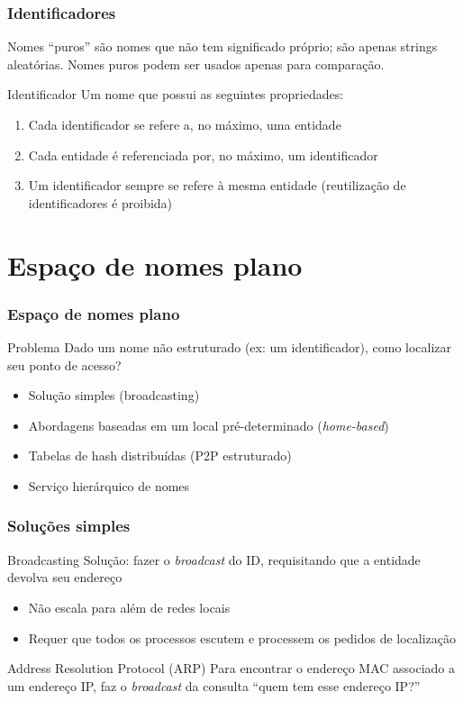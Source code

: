 \documentclass[Ligatures=TeX,table,brazil,svgnames,usetotalslideindicator,compress,10pt]{beamer}
\begin{document}
\begin{frame}
  \frametitle{Identificadores}
  \begin{block}{Nomes ``puros''}
    são nomes que não tem significado próprio; são apenas strings
    aleatórias. Nomes puros podem ser usados apenas para comparação.
  \end{block}

  \begin{block}{Identificador}
    Um nome que possui as seguintes propriedades:
    \begin{enumerate}
    \item Cada identificador se refere a, no máximo, uma entidade
    \item Cada entidade é referenciada por, no máximo, um identificador
    \item Um identificador sempre se refere à mesma entidade (reutilização de identificadores é proibida)
    \end{enumerate}
  \end{block}
\end{frame}

\section{Espaço de nomes plano}

\begin{frame}
  \frametitle{Espaço de nomes plano}
  \begin{alertblock}{Problema}
    Dado um nome \alert{não estruturado} (ex: um identificador), como localizar seu \alert{ponto de acesso}?
    \begin{itemize}
    \item Solução simples (broadcasting)
    \item Abordagens baseadas em um local pré-determinado (\textit{home-based})
    \item Tabelas de hash distribuídas (P2P estruturado)
    \item Serviço hierárquico de nomes
    \end{itemize}
  \end{alertblock}
\end{frame}

\begin{frame}
  \frametitle{Soluções simples}
  \begin{block}{Broadcasting}
    Solução: fazer o \textit{broadcast} do ID, requisitando que a entidade devolva seu endereço
    \begin{itemize}
    \item Não escala para além de redes locais
    \item Requer que todos os processos escutem e processem os pedidos de localização
    \end{itemize}

    \begin{block}{Address Resolution Protocol (ARP)}
      Para encontrar o endereço MAC associado a um endereço IP, faz o \textit{broadcast} da consulta ``quem tem esse endereço IP?''
    \end{block}
  \end{block}
\end{frame}
\end{document}
